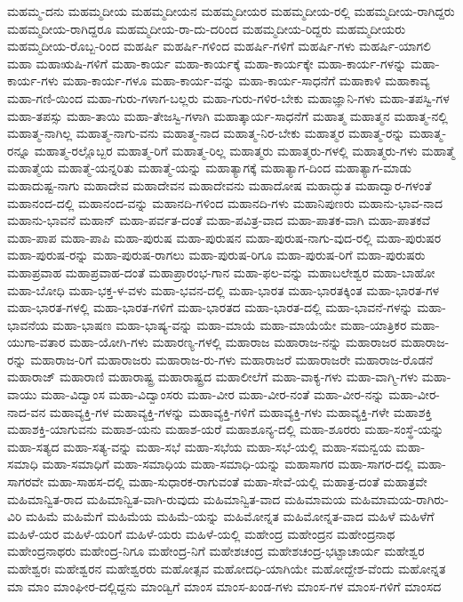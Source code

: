 {ಮಹಮ್ಮ-ದನು
ಮಹಮ್ಮದೀಯ
ಮಹಮ್ಮದೀಯನ
ಮಹಮ್ಮದೀಯರ
ಮಹಮ್ಮದೀಯ-ರಲ್ಲಿ
ಮಹಮ್ಮದೀಯ-ರಾಗಿದ್ದರು
ಮಹಮ್ಮದೀಯ-ರಾಗಿದ್ದರೂ
ಮಹಮ್ಮದೀಯ-ರಾ-ದು-ದರಿಂದ
ಮಹಮ್ಮದೀಯ-ರಿದ್ದರು
ಮಹಮ್ಮದೀಯರು
ಮಹಮ್ಮದೀಯ-ರೊಬ್ಬ-ರಿಂದ
ಮಹರ್ಷಿ
ಮಹರ್ಷಿ-ಗಳಿಂದ
ಮಹರ್ಷಿ-ಗಳಿಗೆ
ಮಹರ್ಷಿ-ಗಳು
ಮಹರ್ಷಿ-ಯಾಗಲಿ
ಮಹಾ
ಮಹಾಋಷಿ-ಗಳಿಗೆ
ಮಹಾ-ಕಾರ್ಯ
ಮಹಾ-ಕಾರ್ಯಕ್ಕೆ
ಮಹಾ-ಕಾರ್ಯಕ್ಕೇ
ಮಹಾ-ಕಾರ್ಯ-ಗಳನ್ನು
ಮಹಾ-ಕಾರ್ಯ-ಗಳು
ಮಹಾ-ಕಾರ್ಯ-ಗಳೂ
ಮಹಾ-ಕಾರ್ಯ-ವನ್ನು
ಮಹಾ-ಕಾರ್ಯ-ಸಾಧನೆಗೆ
ಮಹಾಕಾಳಿ
ಮಹಾಕಾವ್ಯ
ಮಹಾ-ಗಣಿ-ಯಿಂದ
ಮಹಾ-ಗುರು-ಗಳಾಗ-ಬಲ್ಲರು
ಮಹಾ-ಗುರು-ಗಳಿರ-ಬೇಕು
ಮಹಾಜ್ಞಾನಿ-ಗಳು
ಮಹಾ-ತಪಸ್ವಿ-ಗಳ
ಮಹಾ-ತಪಸ್ಸು
ಮಹಾ-ತಾಯಿ
ಮಹಾ-ತೇಜಸ್ವಿ-ಗಳಾಗಿ
ಮಹಾತ್ಕಾರ್ಯ-ಸಾಧನೆಗೆ
ಮಹಾತ್ಮ
ಮಹಾತ್ಮನ
ಮಹಾತ್ಮ-ನಲ್ಲಿ
ಮಹಾತ್ಮ-ನಾಗಿಲ್ಲ
ಮಹಾತ್ಮ-ನಾಗು-ವನು
ಮಹಾತ್ಮ-ನಾದ
ಮಹಾತ್ಮ-ನಿರ-ಬೇಕು
ಮಹಾತ್ಮರ
ಮಹಾತ್ಮ-ರನ್ನು
ಮಹಾತ್ಮ-ರನ್ನೂ
ಮಹಾತ್ಮ-ರಲ್ಲೊಬ್ಬರ
ಮಹಾತ್ಮ-ರಿಗೆ
ಮಹಾತ್ಮ-ರಿಲ್ಲ
ಮಹಾತ್ಮರು
ಮಹಾತ್ಮರು-ಗಳಲ್ಲಿ
ಮಹಾತ್ಮರು-ಗಳು
ಮಹಾತ್ಮೆ
ಮಹಾತ್ಮೆಯ
ಮಹಾತ್ಮೆ-ಯನ್ನರಿತು
ಮಹಾತ್ಮೆ-ಯನ್ನು
ಮಹಾತ್ಯಾಗಕ್ಕೆ
ಮಹಾತ್ಯಾಗ-ದಿಂದ
ಮಹಾತ್ಯಾಗ-ಮಾಡು
ಮಹಾದುಷ್ಟ-ನಾಗು
ಮಹಾದೇವ
ಮಹಾದೇವನ
ಮಹಾದೇವನು
ಮಹಾದೋಷ
ಮಹಾದ್ಭುತ
ಮಹಾದ್ವಾರ-ಗಳಂತೆ
ಮಹಾನಂದ-ದಲ್ಲಿ
ಮಹಾನಂದ-ವನ್ನು
ಮಹಾನದಿ-ಗಳಿಂದ
ಮಹಾನದಿ-ಗಳು
ಮಹಾನಿಪುಣರು
ಮಹಾನು-ಭಾವ-ನಾದ
ಮಹಾನು-ಭಾವನೆ
ಮಹಾನ್
ಮಹಾ-ಪರ್ವತ-ದಂತೆ
ಮಹಾ-ಪವಿತ್ರ-ವಾದ
ಮಹಾ-ಪಾತಕ-ವಾಗಿ
ಮಹಾ-ಪಾತಕವೆ
ಮಹಾ-ಪಾಪ
ಮಹಾ-ಪಾಪಿ
ಮಹಾ-ಪುರುಷ
ಮಹಾ-ಪುರುಷನ
ಮಹಾ-ಪುರುಷ-ನಾಗು-ವುದ-ರಲ್ಲಿ
ಮಹಾ-ಪುರುಷರ
ಮಹಾ-ಪುರುಷ-ರನ್ನು
ಮಹಾ-ಪುರುಷ-ರಾಗಲು
ಮಹಾ-ಪುರುಷ-ರಿಗೂ
ಮಹಾ-ಪುರುಷ-ರಿಗೆ
ಮಹಾ-ಪುರುಷರು
ಮಹಾಪ್ರವಾಹ
ಮಹಾಪ್ರವಾಹ-ದಂತೆ
ಮಹಾಪ್ರಾರಂಭ-ಗಾನ
ಮಹಾ-ಫಲ-ವನ್ನು
ಮಹಾಬಲೇಶ್ವರ
ಮಹಾ-ಬಾಹೋ
ಮಹಾ-ಬೋಧಿ
ಮಹಾ-ಭಕ್ತ-ಳ-ವಳು
ಮಹಾ-ಭವನ-ದಲ್ಲಿ
ಮಹಾ-ಭಾರತ
ಮಹಾ-ಭಾರತಕ್ಕಿಂತ
ಮಹಾ-ಭಾರತ-ಗಳ
ಮಹಾ-ಭಾರತ-ಗಳಲ್ಲಿ
ಮಹಾ-ಭಾರತ-ಗಳಿಗೆ
ಮಹಾ-ಭಾರತದ
ಮಹಾ-ಭಾರತ-ದಲ್ಲಿ
ಮಹಾ-ಭಾವನೆ-ಗಳನ್ನು
ಮಹಾ-ಭಾವನೆಯ
ಮಹಾ-ಭಾಷಣ
ಮಹಾ-ಭಾಷ್ಯ-ವನ್ನು
ಮಹಾ-ಮಾಯೆ
ಮಹಾ-ಮಾಯೆಯೇ
ಮಹಾ-ಯಾತ್ರಿಕರ
ಮಹಾ-ಯುಗಾ-ವತಾರ
ಮಹಾ-ಯೋಗಿ-ಗಳು
ಮಹಾರಣ್ಯ-ಗಳಲ್ಲಿ
ಮಹಾರಾಜ
ಮಹಾರಾಜ-ನನ್ನು
ಮಹಾರಾಜರ
ಮಹಾರಾಜ-ರನ್ನು
ಮಹಾರಾಜ-ರಿಗೆ
ಮಹಾರಾಜರು
ಮಹಾರಾಜ-ರು-ಗಳು
ಮಹಾರಾಜರೆ
ಮಹಾರಾಜರೇ
ಮಹಾರಾಜ-ರೊಡನೆ
ಮಹಾರಾಜ್
ಮಹಾರಾಣಿ
ಮಹಾರಾಷ್ಟ್ರ
ಮಹಾರಾಷ್ಟ್ರದ
ಮಹಾಲೀಲೆಗೆ
ಮಹಾ-ವಾಕ್ಯ-ಗಳು
ಮಹಾ-ವಾಗ್ಮಿ-ಗಳು
ಮಹಾ-ವಾಯು
ಮಹಾ-ವಿದ್ವಾಂಸ
ಮಹಾ-ವಿದ್ವಾಂಸರು
ಮಹಾ-ವೀರ
ಮಹಾ-ವೀರ-ನಂತೆ
ಮಹಾ-ವೀರ-ನನ್ನು
ಮಹಾ-ವೀರ-ನಾದ-ವನ
ಮಹಾವ್ಯಕ್ತಿ-ಗಳ
ಮಹಾವ್ಯಕ್ತಿ-ಗಳನ್ನು
ಮಹಾವ್ಯಕ್ತಿ-ಗಳಿಗೆ
ಮಹಾವ್ಯಕ್ತಿ-ಗಳು
ಮಹಾವ್ಯಕ್ತಿ-ಗಳೇ
ಮಹಾಶಕ್ತಿ
ಮಹಾಶಕ್ತಿ-ಯಾಗುವನು
ಮಹಾಶ-ಯನು
ಮಹಾಶ-ಯರೆ
ಮಹಾಶೂನ್ಯ-ದಲ್ಲಿ
ಮಹಾ-ಶೂರರು
ಮಹಾ-ಸಂಸ್ಥೆ-ಯನ್ನು
ಮಹಾ-ಸತ್ಯದ
ಮಹಾ-ಸತ್ಯ-ವನ್ನು
ಮಹಾ-ಸಭೆ
ಮಹಾ-ಸಭೆಯ
ಮಹಾ-ಸಭೆ-ಯಲ್ಲಿ
ಮಹಾ-ಸಮನ್ವಯ
ಮಹಾ-ಸಮಾಧಿ
ಮಹಾ-ಸಮಾಧಿಗೆ
ಮಹಾ-ಸಮಾಧಿಯ
ಮಹಾ-ಸಮಾಧಿ-ಯನ್ನು
ಮಹಾಸಾಗರ
ಮಹಾ-ಸಾಗರ-ದಲ್ಲಿ
ಮಹಾ-ಸಾಗರವೇ
ಮಹಾ-ಸಾಹಸ-ದಲ್ಲಿ
ಮಹಾ-ಸುಧಾರಕ-ರಾಗುವಂತೆ
ಮಹಾ-ಸೇವೆ-ಯಲ್ಲಿ
ಮಹಾತ್ರ-ದಂತೆ
ಮಹಾತ್ರವೇ
ಮಹಿಮಾನ್ವಿತ-ರಾದ
ಮಹಿಮಾನ್ವಿತ-ವಾಗಿ-ರುವುದು
ಮಹಿಮಾನ್ವಿತ-ವಾದ
ಮಹಿಮಾಮಯ
ಮಹಿಮಾಮಯ-ರಾಗಿರು-ವಿರಿ
ಮಹಿಮೆ
ಮಹಿಮೆಗೆ
ಮಹಿಮೆಯ
ಮಹಿಮೆ-ಯನ್ನು
ಮಹಿಮೋನ್ನತ
ಮಹಿಮೋನ್ನತ-ವಾದ
ಮಹಿಳೆ
ಮಹಿಳೆಗೆ
ಮಹಿಳೆ-ಯರ
ಮಹಿಳೆ-ಯರಿಗೆ
ಮಹಿಳೆ-ಯರು
ಮಹಿಳೆ-ಯಲ್ಲಿ
ಮಹೇಂದ್ರ
ಮಹೇಂದ್ರನ
ಮಹೇಂದ್ರನಾಥ
ಮಹೇಂದ್ರನಾಥರು
ಮಹೇಂದ್ರ-ನಿಗೂ
ಮಹೇಂದ್ರ-ನಿಗೆ
ಮಹೇಶಚಂದ್ರ
ಮಹೇಶಚಂದ್ರ-ಭಟ್ಟಾಚಾರ್ಯ
ಮಹೇಶ್ವರ
ಮಹೇಶ್ವರಃ
ಮಹೇಶ್ವರನ
ಮಹೇಶ್ವರರು
ಮಹೋತ್ಸವ
ಮಹೋದಧಿ-ಯಾಗಿಯೇ
ಮಹೋದ್ದೇಶ-ವೆಂದು
ಮಹೋನ್ನತ
ಮಾ
ಮಾಂ
ಮಾಂಘೀರ-ದಲ್ಲಿದ್ದನು
ಮಾಂಡ್ವಿಗೆ
ಮಾಂಸ
ಮಾಂಸ-ಖಂಡ-ಗಳು
ಮಾಂಸ-ಗಳ
ಮಾಂಸ-ಗಳಿಗೆ
ಮಾಂಸದ
}
